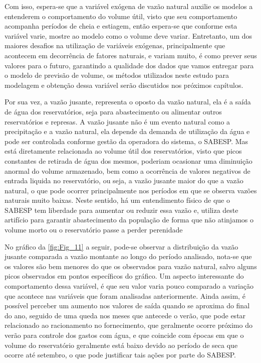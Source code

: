 Com isso, espera-se que a variável exógena de vazão natural auxilie os modelos a entenderem o comportamento do volume útil, visto que seu comportamento acompanha períodos de cheia e estiagem, então espera-se que conforme esta variável varie, mostre ao modelo como o volume deve variar. Entretanto, um dos maiores desafios na utilização de variáveis exógenas, principalmente que acontecem em decorrência de fatores naturais, e variam muito, é como prever seus valores para o futuro, garantindo a qualidade dos dados que vamos entregar para o modelo de previsão de volume, os métodos utilizados neste estudo para modelagem e obtenção dessa variável serão discutidos nos próximos capítulos.  

Por sua vez, a vazão jusante, representa o oposto da vazão natural, ela é a saída de água dos reservatórios, seja para abastecimento ou alimentar outros reservatórios e represas. A vazão jusante não é um evento natural como a precipitação e a vazão natural, ela depende da demanda de utilização da água e pode ser controlada conforme gestão da operadora do sistema, o \acrshort{SABESP}. Mas está diretamente relacionada ao volume útil dos reservatórios, visto que picos constantes de retirada de água dos mesmos, poderiam ocasionar uma diminuição anormal do volume armazenado, bem como a ocorrência de valores negativos de entrada liquida no reservatório, ou seja, a vazão jusante maior do que a vazão natural, o que pode ocorrer principalmente nos períodos em que se observa vazões naturais muito baixas. Neste sentido, há um entendimento físico de que o \acrshort{SABESP} tem liberdade para aumentar ou reduzir essa vazão e, utiliza deste artifício para garantir abastecimento da população de forma que não atinjamos o volume morto ou o reservatório passe a perder perenidade 

No gráfico da \autoref{fig:Fig_11} a seguir, pode-se observar a distribuição da vazão jusante comparada a vazão montante ao longo do período analisado, nota-se que os valores são bem menores do que os observados para vazão natural, salvo alguns picos observados em pontos específicos do gráfico. Um aspecto interessante do comportamento dessa variável, é que seu valor varia pouco comparado a variação que acontece nas variáveis que foram analisadas anteriormente. Ainda assim, é possível perceber um aumento nos valores de saída quando se aproxima do final do ano, seguido de uma queda nos meses que antecede o verão, que pode estar relacionado ao racionamento no fornecimento, que geralmente ocorre próximo do verão para controle dos gastos com água, e que coincide com épocas em que o volume do reservatório geralmente está baixo devido ao período de seca que ocorre até setembro, o que pode justificar tais ações por parte do \acrshort{SABESP}.  

